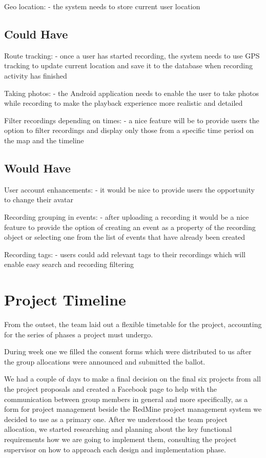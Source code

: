 \documentclass{l3proj}
\begin{document}
	Geo location:
		- the system needs to store current user location


\subsection{Could Have}
	Route tracking:
		- once a user has started recording, the system needs to use GPS tracking to update current location and save it to the database when recording activity has finished

	Taking photos:
		- the Android application needs to enable the user to take photos while recording to make the playback experience more realistic and detailed

	Filter recordings depending on times:
		- a nice feature will be to provide users the option to filter recordings and display only those from a specific time period on the map and the timeline

\subsection{Would Have}
	User account enhancements:
		- it would be nice to provide users the opportunity to change their avatar

	Recording grouping in events:
		- after uploading a recording it would be a nice feature to provide the option of creating an event as a property of the recording object or selecting one from the list of events that have already been created

	Recording tags:
		- users could add relevant tags to their recordings which will enable easy search and recording filtering


\section{Project Timeline}

From the outset, the team laid out a flexible timetable for the project, accounting for the series of phases a project must undergo.

During week one we filled the consent forms which were distributed to us after the group allocations were announced and submitted the ballot.

We had a couple of days to make a final decision on the final six projects from all the project proposals and created a Facebook page to help with the communication between group members in general and more specifically, as a form for project management beside the RedMine project management system we decided to use as a primary one.
After we understood the team project allocation, we started researching and planning about the key functional requirements how we are going to implement them, consulting the project supervisor on how to approach each design and implementation phase.
\end{document}
